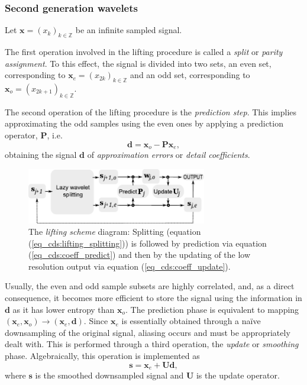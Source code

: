 \documentclass[graybox]{svmult}
\begin{document}
	\subsubsection{Second generation wavelets}
	Let $\mathbf{x} = (x_k)_{k\in \mathbb{Z}}$ be an infinite sampled signal.
	
	The first operation involved in the lifting procedure is called a \emph{split} or \emph{parity assignment}. To this effect, the signal is divided into two sets, an even set, corresponding to $\mathbf{x}_e = (x_{2k})_{k\in \mathbb{Z}}$ and an odd set, corresponding to $\mathbf{x}_o = (x_{2k+1})_{k\in\mathbb{Z}}$.
	
	The second operation of the lifting procedure is the \emph{prediction step}. This implies approximating the odd samples using the even ones by applying a prediction operator, $\mathbf{P}$, i.e.
	\begin{equation}
	\mathbf{d} = \mathbf{x}_o - \mathbf{P} \mathbf{x}_e,
	\end{equation}
	obtaining the signal $\mathbf{d}$ of \emph{approximation errors} or \emph{detail coefficients}.
	
	
	\begin{figure}[t]
		\centering
		\includegraphics[width=0.7\textwidth]{lifting_diagram_block}
		\caption{The \emph{lifting scheme} diagram: Splitting (equation (\ref{eq_cds:lifting_splitting})) is followed by prediction via equation (\ref{eq_cds:coeff_predict}) and then by the updating of the low resolution output via equation (\ref{eq_cds:coeff_update}).}
		\label{fig_cds:lifting_diagram}
	\end{figure}
	
	
	Usually, the even and odd sample subsets are highly correlated, and, as a direct consequence, it becomes more efficient to store the signal using the information in $\mathbf{d}$ as it has lower entropy than $\mathbf{x}_o$. The prediction phase is equivalent to mapping $(\mathbf{x}_e, \mathbf{x}_o) \to (\mathbf{x}_e, \mathbf{d})$. Since $\mathbf{x}_e$ is essentially obtained through a na\"ive downsampling of the original signal, aliasing occurs and must be appropriately dealt with. This is performed through a third operation, the \emph{update} or \emph{smoothing} phase. Algebraically, this operation is implemented as
	\begin{equation}
	\mathbf{s} = \mathbf{x}_e + \mathbf{U}\mathbf{d},
	\end{equation}
	where $\mathbf{s}$ is the smoothed downsampled signal and $\mathbf{U}$ is the update operator. 
	
\end{document}
